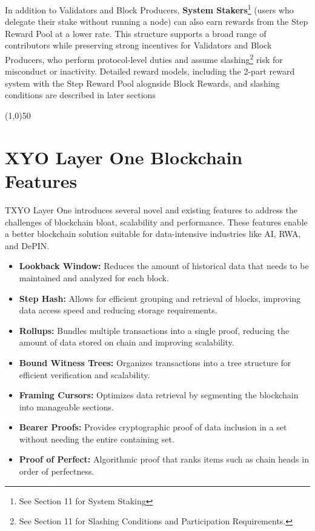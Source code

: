 \documentclass{article}
\begin{document}
In addition to Validators and Block Producers, \textbf{System Stakers}\footnote{See Section 11 for System Staking} (users who delegate their stake without running a node) can also earn rewards from the Step Reward Pool at a lower rate. This structure supports a broad range of contributors while preserving strong incentives for Validators and Block Producers, who perform protocol-level duties and assume slashing\footnote{See Section 11 for Slashing Conditions and Participation Requirements.} risk for misconduct or inactivity. Detailed reward models, including the 2-part reward system with the Step Reward Pool alognside Block Rewards, and slashing conditions are described in later sections


\begin{center}
    \line(1,0){50}
\end{center}

\section{XYO Layer One Blockchain Features}
TXYO Layer One introduces several novel and existing features to address the challenges of blockchain bloat, scalability and performance. These features enable a better blockchain solution suitable for data-intensive industries like AI, RWA, and DePIN. 

\begin{itemize}
    \item \textbf{Lookback Window:} Reduces the amount of historical data that needs to be maintained and analyzed for each block. 
    \item \textbf{Step Hash:} Allows for efficient grouping and retrieval of blocks, improving data access speed and reducing storage requirements. 
    \item \textbf{Rollups:} Bundles multiple transactions into a single proof, reducing the amount of data stored on chain and improving scalability.
    \item \textbf{Bound Witness Trees:} Organizes transactions into a tree structure for efficient verification and scalability. 
    \item \textbf{Framing Cursors:} Optimizes data retrieval by segmenting the blockchain into manageable sections.
    \item \textbf{Bearer Proofs:} Provides cryptographic proof of data inclusion in a set without needing the entire containing set. 
    \item \textbf{Proof of Perfect:} Algorithmic proof that ranks items such as chain heads in order of perfectness.
\end{itemize}
\end{document}
